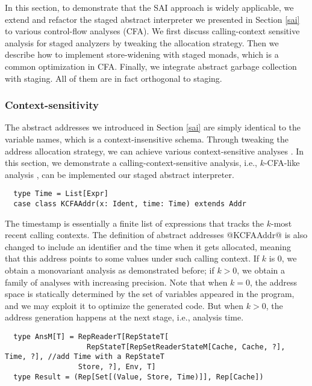 In this section, to demonstrate that the SAI approach is widely applicable, we
extend and refactor the staged abstract interpreter we presented in Section
\ref{sai} to various control-flow analyses (CFA). We first discuss
calling-context sensitive analysis for staged analyzers by tweaking the
allocation strategy. Then we describe how to implement store-widening with
staged monads, which is a common optimization in CFA. Finally, we integrate
abstract garbage collection with staging. All of them are in fact orthogonal to
staging.

\subsubsection{Context-sensitivity}

The abstract addresses we introduced in Section \ref{sai} are simply identical
to the variable names, which is a context-insensitive schema.  Through tweaking
the address allocation strategy, we can achieve various context-sensitive
analyses \cite{DBLP:conf/icfp/Gilray0M16}. In this section, we demonstrate a
calling-context-sensitive analysis, i.e., $k$-CFA-like analysis
\cite{DBLP:journals/jfp/HornM12}, can be implemented our staged abstract
interpreter.
\begin{lstlisting}
  type Time = List[Expr]
  case class KCFAAddr(x: Ident, time: Time) extends Addr
\end{lstlisting}

The timestamp is essentially a finite list of expressions that tracks the $k$-most
recent calling contexts. The definition of abstract addresses @KCFAAddr@ is also
changed to include an identifier and the time when it gets allocated, meaning that
this address points to some values under such calling context. If $k$ is 0, we
obtain a monovariant analysis as demonstrated before; if $k > 0$, we obtain a
family of analyses with increasing precision. Note that when $k = 0$, the
address space is statically determined by the set of variables appeared in the
program, and we may exploit it to optimize the generated code. But when $k > 0$,
the address generation happens at the next stage, i.e., analysis time.
\begin{lstlisting}
  type AnsM[T] = RepReaderT[RepStateT[
                   RepStateT[RepSetReaderStateM[Cache, Cache, ?], Time, ?], //add Time with a RepStateT
                 Store, ?], Env, T]
  type Result = (Rep[Set[(Value, Store, Time)]], Rep[Cache])
\end{lstlisting}

